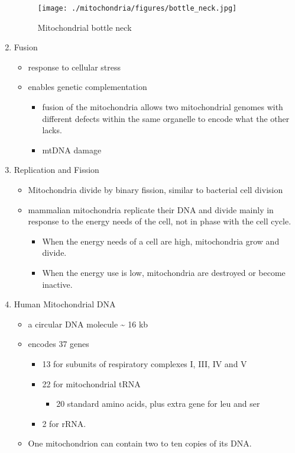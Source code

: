 \documentclass{scrartcl}
\begin{document}
\begin{enumerate}
\begin{figure}[htbp]
\centering
\texttt{[image: ./mitochondria/figures/bottle\_neck.jpg]}
\caption[bottle]{\label{fig:orgf5c66a8}
Mitochondrial bottle neck}
\end{figure}

\item Fusion
\label{sec:org5d5e86d}
\begin{itemize}
\item response to cellular stress
\item enables genetic complementation
\begin{itemize}
\item fusion of the mitochondria allows two mitochondrial genomes with
different defects within the same organelle to encode what the
other lacks.
\item mtDNA damage
\end{itemize}
\end{itemize}

\item Replication and Fission
\label{sec:org6ad5f24}
\begin{itemize}
\item Mitochondria divide by binary fission, similar to bacterial cell division
\item mammalian mitochondria replicate their DNA and divide mainly in response
to the energy needs of the cell, not in phase with the cell cycle.
\begin{itemize}
\item When the energy needs of a cell are high, mitochondria grow and
divide.
\item When the energy use is low, mitochondria are destroyed
or become inactive.
\end{itemize}
\end{itemize}
\item Human Mitochondrial DNA
\label{sec:org67f9499}
\begin{itemize}
\item a circular DNA molecule \textasciitilde{} 16 kb
\item encodes 37 genes
\begin{itemize}
\item 13 for subunits of respiratory complexes I, III, IV and V
\item 22 for mitochondrial tRNA
\begin{itemize}
\item 20 standard amino acids, plus extra gene for leu and ser
\end{itemize}
\item 2 for rRNA.
\end{itemize}
\item One mitochondrion can contain two to ten copies of its DNA.
\end{itemize}


\end{enumerate}
\end{document}
